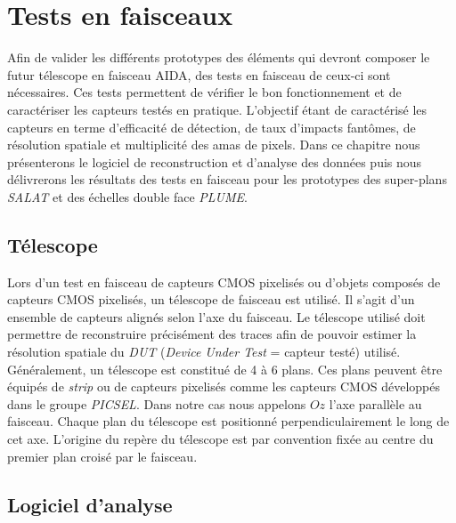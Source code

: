 \chapter{Tests en faisceaux}

 Afin de valider les diff\'erents prototypes des \'el\'ements qui devront composer le futur télescope en faisceau AIDA, des tests en faisceau de ceux-ci sont n\'ecessaires. Ces tests permettent de v\'erifier le bon fonctionnement et de caract\'eriser les capteurs test\'es en pratique. L'objectif \'etant de caract\'eris\'e les capteurs en terme d'efficacit\'e de d\'etection, de taux d'impacts fant\^omes, de r\'esolution spatiale et multiplicit\'e des amas de pixels. Dans ce chapitre nous pr\'esenterons le logiciel de reconstruction et d'analyse des donn\'ees puis nous d\'elivrerons les r\'esultats des tests en faisceau pour les prototypes des super-plans \textit{SALAT} et des échelles double face \textit{PLUME}.

 \section{T\'elescope}
   
  Lors d'un test en faisceau de capteurs CMOS pixelis\'es ou d'objets compos\'es de capteurs CMOS pixelis\'es, un t\'elescope de faisceau est utilis\'e. Il s'agit d'un ensemble de capteurs align\'es selon l'axe du faisceau. Le t\'elescope utilis\'e doit permettre de reconstruire pr\'ecis\'ement des traces afin de pouvoir estimer la r\'esolution spatiale du \textit{DUT} (\textit{Device Under Test} = capteur test\'e) utilis\'e. G\'en\'eralement, un t\'elescope est constitu\'e de 4 \`a 6 plans. Ces plans peuvent \^etre \'equip\'es de \textit{strip} ou de capteurs pixelis\'es comme les capteurs CMOS d\'evelopp\'es dans le groupe \textit{PICSEL}. Dans notre cas nous appelons $Oz$ l'axe parall\`ele au faisceau. Chaque plan du t\'elescope est positionn\'e perpendiculairement le long de cet axe. L'origine du rep\`ere du t\'elescope est par convention fix\'ee au centre du premier plan crois\'e par le faisceau.

\section{Logiciel d'analyse}
\label{sect:TAF}

